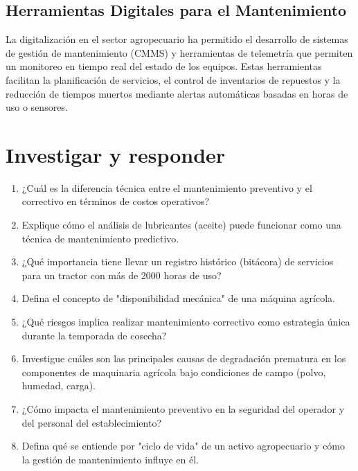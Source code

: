 \subsection*{Herramientas Digitales para el Mantenimiento}
La digitalización en el sector agropecuario ha permitido el desarrollo de sistemas
de gestión de mantenimiento (CMMS) y herramientas de telemetría que permiten
un monitoreo en tiempo real del estado de los equipos. Estas herramientas facilitan
la planificación de servicios, el control de inventarios de repuestos y la reducción
de tiempos muertos mediante alertas automáticas basadas en horas de uso o sensores.

\section*{\faPencil\space Investigar y responder}
\begin{enumerate}
	\item ¿Cuál es la diferencia técnica entre el mantenimiento preventivo y el
	      correctivo en términos de costos operativos?
	\item Explique cómo el análisis de lubricantes (aceite) puede funcionar como una
	      técnica de mantenimiento predictivo.
	\item ¿Qué importancia tiene llevar un registro histórico (bitácora) de servicios
	      para un tractor con más de 2000 horas de uso?
	\item Defina el concepto de "disponibilidad mecánica" de una máquina agrícola.
	\item ¿Qué riesgos implica realizar mantenimiento correctivo como estrategia única
	      durante la temporada de cosecha?
	\item Investigue cuáles son las principales causas de degradación prematura en los
	      componentes de maquinaria agrícola bajo condiciones de campo (polvo,
	      humedad, carga).
	\item ¿Cómo impacta el mantenimiento preventivo en la seguridad del operador y del
	      personal del establecimiento?
	\item Defina qué se entiende por "ciclo de vida" de un activo agropecuario y cómo
	      la gestión de mantenimiento influye en él.
\end{enumerate}

